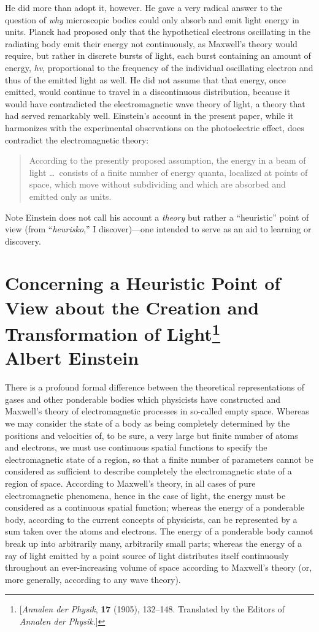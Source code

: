 He did more than adopt it, however. He gave a very radical answer to the
question of \emph{why} microscopic bodies could only absorb and emit
light energy in units. Planck had proposed only that the hypothetical
electrons oscillating in the radiating body emit their energy not
continuously, as Maxwell's theory would require, but rather in discrete
bursts of light, each burst containing an amount of energy, \emph{hv},
proportional to the frequency of the individual oscillating electron and
thus of the emitted light as well. He did not assume that that energy,
once emitted, would continue to travel in a discontinuous distribution,
because it would have contradicted the electromagnetic wave theory of
light, a theory that had served remarkably well. Einstein's account in
the present paper, while it harmonizes with the experimental
observations on the photoelectric effect, does contradict the
electromagnetic theory:
\begin{quote}
According to the presently proposed assumption, the energy in a beam of
light \ldots\ consists of a finite number of energy quanta, localized at
points of space, which move without subdividing and which are absorbed
and emitted only as units.
\end{quote}

Note Einstein does not call his account a \emph{theory} but rather a
``heuristic'' point of view (from ``\emph{heurisko},'' I discover)---one
intended to serve as an aid to learning or discovery.


\section*{Concerning a Heuristic Point of View about the
Creation and Transformation of Light\footnote{{[}\emph{Annalen der
  Physik}, \textbf{17} (1905), 132--148. Translated by the Editors of
  \emph{Annalen der Physik}.{]}}\\
  {\large Albert Einstein}}

There is a profound formal difference between the theoretical
representations of gases and other ponderable bodies which physicists
have constructed and Maxwell's theory of electromagnetic processes in
so-called empty space. Whereas we may consider the state of a body as
being completely determined by the positions and velocities of, to be
sure, a very large but finite number of atoms and electrons, we must use
continuous spatial functions to specify the electromagnetic state of a
region, so that a finite number of parameters cannot be considered as
sufficient to describe completely the electromagnetic state of a region
of space. According to Maxwell's theory, in all cases of pure
electromagnetic phenomena, hence in the case of light, the energy must
be considered as a continuous spatial function; whereas the energy of a
ponderable body, according to the current concepts of physicists, can be
represented by a sum taken over the atoms and electrons. The energy of a
ponderable body cannot break up into arbitrarily many, arbitrarily small
parts; whereas the energy of a ray of light emitted by a point source of
light distributes itself continuously throughout an ever-increasing
volume of space according to Maxwell's theory (or, more generally,
according to any wave theory).

